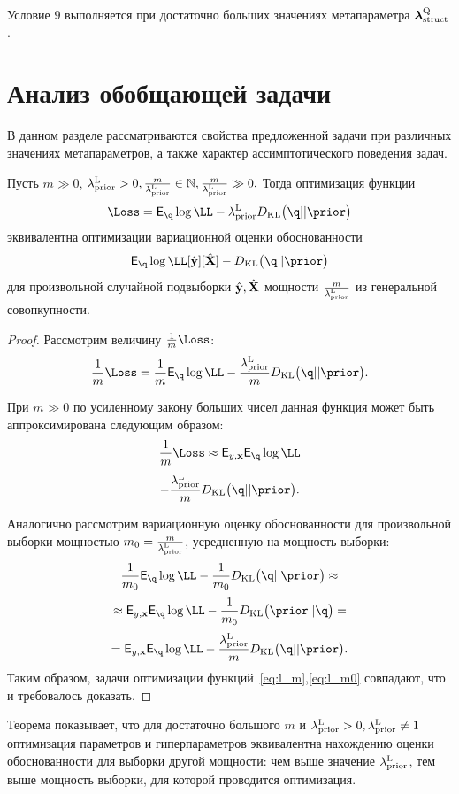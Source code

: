 Условие 9 выполняется при достаточно больших значениях метапараметра $\boldsymbol{\lambda}_\text{struct}^\text{Q}$. 




\section{Анализ обобщающей задачи}
В данном разделе рассматриваются свойства предложенной задачи при различных значениях метапараметров, а также характер ассимптотического поведения задач.


\begin{theorem}
Пусть $m \gg 0$, $\lambda_\text{prior}^\text{L} > 0, \frac{m}{\lambda_\text{prior}^\text{L}}   \in \mathbb{N}, \frac{m}{\lambda_\text{prior}^\text{L}}  \gg 0.$ Тогда оптимизация функции
\[
\Loss = \E_{\q} \log \LL - \lamCL\KL{\q}{\prior}
\]
 эквивалентна оптимизации вариационной оценки обоснованности  $$\E_{\q} \log \LL[\hat{\y}][\hat{\X}] - \KL{\q}{\prior}$$
для произвольной случайной подвыборки $\hat{\mathbf{y}}, \hat{\mathbf{X}}$ мощности $\frac{m}{{\lambda_\text{prior}^\text{L}}}$ из генеральной совопкупности.
\end{theorem}
\label{th:elbo_size}
\begin{proof}
Рассмотрим величину  $\frac{1}{m}\Loss$: \\
\begin{equation}
\label{eq:l_m}
    \frac{1}{m}\Loss = \frac{1}{m}\E_{\q} \log \LL - \frac{\lamCL}{m}\KL{\q}{\prior}.
\end{equation}

При $m \gg 0$ по усиленному закону больших чисел данная функция может быть аппроксимирована следующим образом:
\[
    \frac{1}{m}\Loss \approx  \E_{y,\x} \E_{\q} \log \LL 
\]
\[
-\frac{\lamCL}{m}\KL{\q}{\prior}.
\]

Аналогично рассмотрим вариационную оценку обоснованности для произвольной выборки мощностью $m_0 = \frac{m}{\lambda_\text{prior}^\text{L}}$, усредненную на мощность выборки:
\begin{equation}
\label{eq:l_m0}
    \frac{1}{m_0}\E_{\q} \log \LL - \frac{1}{m_0} \KL{\q}{\prior} \approx
\end{equation}
\[
\approx  \E_{y,\x} \E_{\q} \log \LL  -\frac{1}{m_0}\KL{\prior}{\q}= 
\]
\[
= \E_{y,\x} \E_{\q} \log \LL  -\frac{\lamCL}{m}\KL{\q}{\prior}.
\]
Таким образом, задачи оптимизации функций~\eqref{eq:l_m},\eqref{eq:l_m0} совпадают, что и требовалось доказать.
\end{proof}
Теорема показывает, что для достаточно большого $m$ и $\lambda_\text{prior}^\text{L}>0, \lambda_\text{prior}^\text{L} \neq 1$ оптимизация параметров и гиперпараметров эквивалентна нахождению оценки обоснованности для выборки другой мощности: чем выше значение $ \lambda_\text{prior}^\text{L}$, тем выше мощность выборки, для которой проводится оптимизация.


